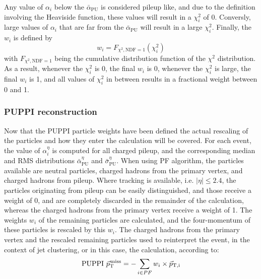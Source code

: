 Any value of $\alpha_i$ below the $\bar{\alpha}_{\text{PU}}$ is considered pileup like, and due to the definition involving the Heaviside function, these values will result in a $\chi_{i}^{2}$ of 0.  
Conversly, large values of $\alpha_i$ that are far from the $\bar{\alpha}_{\text{PU}}$ will result in a large $\chi_{i}^{2}$.
Finally, the $w_{i}$ is defined by
\begin{equation}
w_{i} = F_{\chi^{2}, \mathrm{NDF}=1}(\chi_{i}^{2})
\end{equation} 
with $ F_{\chi^{2}, \mathrm{NDF}=1}$ being the cumulative distribution function of the  $\chi^{2}$ distribution. 
As a result, whenever the $\chi_{i}^{2}$ is 0, the final $w_i$ is 0, whenever the $\chi_{i}^{2}$ is large, the final $w_i$ is 1, and all values of $\chi_{i}^{2}$ in between results in a fractional weight between 0 and 1. 
\subsubsection*{PUPPI \ptmiss reconstruction}
\noindent\justify
Now that the PUPPI particle weights have been defined the actual rescaling of the particles and how they enter the \ptmiss calculation will be covered. 
For each event, the value of $\alpha_{i}^{\eta}$ is computed for all charged pileup, and the corresponding median and RMS distributions $\bar{\alpha}_{\text{PU}}^{\eta}$ and $\bar{\sigma}_{\text{PU}}^{\eta}$. 
When using PF algorithm, the particles available are neutral particles, charged hadrons from the primary vertex, and charged hadrons from pileup. 
Where tracking is available, i.e. $|\eta|\leq2.4$, the particles originating from pileup can be easily distinguished, and those receive a weight of 0, and are completely discarded in the remainder of the calculation, whereas the charged hadrons from the primary vertex receive a weight of 1. 
The weights $w_i$ of the remaining particles are calculated, and the four-momentum of these particles is rescaled by this $w_i$. 
The charged hadrons from the primary vertex and the rescaled remaining particles used to reinterpret the event, in the context of jet clustering, or in this case, the \ptmiss calculation, according to:
\begin{equation}
\mathrm{PUPPI}\,\, {\vec p}_{\mathrm{T}}^{\kern1pt\text{miss}} =- \sum_{i\in PF} w_i \times \vec{p}_{\mathrm{T, i}}             
\end{equation}   

